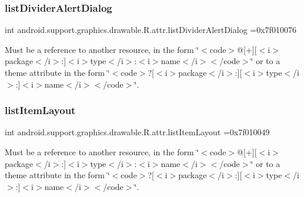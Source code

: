 \subsubsection{\texorpdfstring{list\+Divider\+Alert\+Dialog}{listDividerAlertDialog}}
{\footnotesize\ttfamily int android.\+support.\+graphics.\+drawable.\+R.\+attr.\+list\+Divider\+Alert\+Dialog =0x7f010076\hspace{0.3cm}{\ttfamily [static]}}

Must be a reference to another resource, in the form \char`\"{}$<$code$>$@\mbox{[}+\mbox{]}\mbox{[}$<$i$>$package$<$/i$>$\+:\mbox{]}$<$i$>$type$<$/i$>$\+:$<$i$>$name$<$/i$>$$<$/code$>$\char`\"{} or to a theme attribute in the form \char`\"{}$<$code$>$?\mbox{[}$<$i$>$package$<$/i$>$\+:\mbox{]}\mbox{[}$<$i$>$type$<$/i$>$\+:\mbox{]}$<$i$>$name$<$/i$>$$<$/code$>$\char`\"{}. \mbox{\label{classandroid_1_1support_1_1graphics_1_1drawable_1_1R_1_1attr_a8a60e51b2a8631f9bf63cfd972d09138}} 
\subsubsection{\texorpdfstring{list\+Item\+Layout}{listItemLayout}}
{\footnotesize\ttfamily int android.\+support.\+graphics.\+drawable.\+R.\+attr.\+list\+Item\+Layout =0x7f010049\hspace{0.3cm}{\ttfamily [static]}}

Must be a reference to another resource, in the form \char`\"{}$<$code$>$@\mbox{[}+\mbox{]}\mbox{[}$<$i$>$package$<$/i$>$\+:\mbox{]}$<$i$>$type$<$/i$>$\+:$<$i$>$name$<$/i$>$$<$/code$>$\char`\"{} or to a theme attribute in the form \char`\"{}$<$code$>$?\mbox{[}$<$i$>$package$<$/i$>$\+:\mbox{]}\mbox{[}$<$i$>$type$<$/i$>$\+:\mbox{]}$<$i$>$name$<$/i$>$$<$/code$>$\char`\"{}. \mbox{\label{classandroid_1_1support_1_1graphics_1_1drawable_1_1R_1_1attr_aa76f332ba6dd9ef67af13566ec75047d}} 
